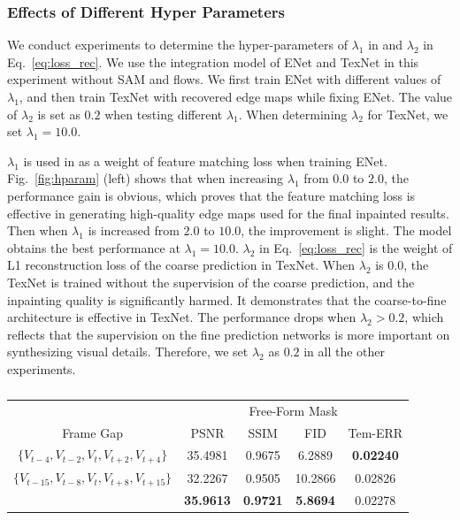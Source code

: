  


\subsubsection{Effects of Different Hyper Parameters}
We conduct experiments to determine the hyper-parameters of $\lambda_1$ in  and $\lambda_2$ in Eq.~\eqref{eq:loss_rec}. 
We use the integration model of ENet and TexNet in this experiment without SAM and flows.
We first train ENet with different values of $\lambda_1$, and then train TexNet with recovered edge maps while fixing ENet. The value of $\lambda_2$ is set as $0.2$ when testing different $\lambda_1$.
When determining $\lambda_2$ for TexNet, we set $\lambda_1=10.0$.

$\lambda_1$ is used in  as a weight of feature matching loss when training ENet.
Fig.~\ref{fig:hparam} (left) shows that when increasing $\lambda_1$ from $0.0$ to $2.0$, the performance gain is obvious, which proves that the feature matching loss is effective in
generating high-quality edge maps used for the final inpainted results. 
Then when $\lambda_1$ is increased from $2.0$ to $10.0$, the improvement is slight.
The model obtains the best performance at $\lambda_1=10.0$.
%
$\lambda_2$ in Eq.~\eqref{eq:loss_rec} is the weight of L1 reconstruction loss of the coarse prediction in TexNet. 
When $\lambda_2$ is $0.0$, the TexNet is trained without the supervision of the coarse prediction, and the inpainting quality is significantly harmed.
It demonstrates that the coarse-to-fine architecture is effective in TexNet. The performance drops when $\lambda_2>0.2$, which reflects that the supervision on the fine prediction networks is more important on synthesizing visual details.
Therefore, we set $\lambda_2$ as $0.2$ in all the other experiments.


\begin{table}[t]
	\caption{ }\smallskip
	\scriptsize
	\centering
	{
		\smallskip\begin{tabular}{c|c|c|c|c}
			\hline
			&\multicolumn{4}{c}{Free-Form Mask}  \\
			\cline{2-5} 
			Frame Gap& PSNR & SSIM & FID & Tem-ERR \\
			
			\hline
			$\{V_{t-4},V_{t-2},V_{t},V_{t+2},V_{t+4}\}$ 
			& 35.4981 & 0.9675 & 6.2889 &\textbf{0.02240} 
			\\ \hline
			$\{V_{t-15},V_{t-8},V_{t},V_{t+8},V_{t+15}\}$ & 32.2267 & 0.9505 &  10.2866 &0.02826
			\\ \hline
		 \msset{V} &\textbf{35.9613} & \textbf{0.9721}&  \textbf{5.8694} &  0.02278 \\
		
			\hline
			
			
		\end{tabular}
	}
	\label{tab:input-gap}
\end{table}

